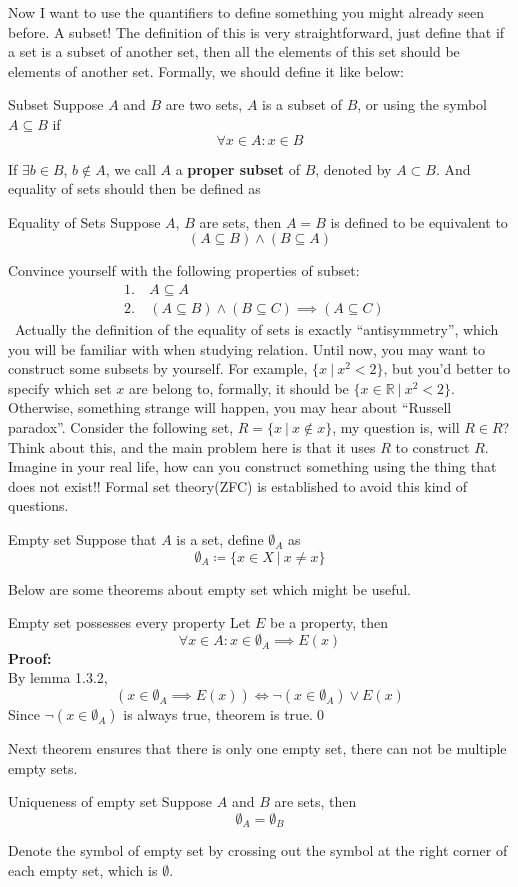 \documentclass{article}
\begin{document}
Now I want to use the quantifiers to define something you might already seen before. A subset! The definition of this is very straightforward, just
define that if a set is a subset of another set, then all the elements of this set should be elements of another set. Formally, we should define it like
below:
\begin{defin}{Subset}
    Suppose $A$ and $B$ are two sets, $A$ is a subset of $B$, or using the symbol $A \subseteq B$ if
    $$
    \forall x \in A : x \in B
    $$
\end{defin}
If $\exists b \in B$, $b \not \in A$, we call $A$ a \textbf{proper subset} of $B$, denoted by $A \subset B$.
And equality of sets should then be defined as
\begin{defin}{Equality of Sets}
    Suppose $A$, $B$ are sets, then
    $A = B$ is defined to be equivalent to
    $$
    (A \subseteq B) \land (B \subseteq A)
    $$
\end{defin}
Convince yourself with the following properties of subset:
\begin{align}
1.\ &A \subseteq A \tag{reflexivity} \\
2.\ &(A\subseteq B) \land(B \subseteq C) \implies (A \subseteq C)\tag{transitivity}&
\end{align}
\quad\ Actually the definition of the equality of sets is exactly ``antisymmetry'', which you will be familiar with when studying relation. Until now, you may want to
construct some subsets by yourself. For example, $\{x\ |\ x^2 < 2\}$, but you'd better to specify which set $x$ are belong to, formally, it should be
$\{x \in \mathbb{R}\ |\  x^2 < 2\}$. Otherwise, something strange will happen, you may hear about ``Russell paradox''. Consider the following set, $R = \{x\ |\ x \not \in x\}$,
my question is, will $R \in R$? Think about this, and the main problem here is that it uses $R$ to construct $R$. Imagine in your real life, how can you construct something
using the thing that does not exist!! Formal set theory(ZFC) is established to avoid this kind of questions.
\begin{defin}{Empty set}
    Suppose that $A$ is a set, define $\emptyset_A$ as
    $$
    \emptyset_A \coloneqq \{x \in X\ |\ x \neq x\}
    $$
\end{defin}
Below are some theorems about empty set which might be useful.
\begin{thm}{Empty set possesses every property}
    Let $E$ be a property, then
    $$
    \forall x \in A : x \in \emptyset_A \implies E(x)
    $$
    \textbf{Proof:}\\
By lemma 1.3.2,
$$
(x \in \emptyset_A \implies E(x)) \iff \neg(x \in \emptyset_A) \lor E(x)
$$
Since $\neg(x \in \emptyset_A)$ is always true, theorem is true.\qed
\end{thm}
Next theorem ensures that there is only one empty set, there can not be multiple empty sets.
\begin{thm}{Uniqueness of empty set}
    Suppose $A$ and $B$ are sets, then
    $$
    \emptyset_A = \emptyset_B
    $$
\end{thm}
Denote the symbol of empty set by crossing out the symbol at the right corner of each empty set, which is $\emptyset$.
\end{document}

